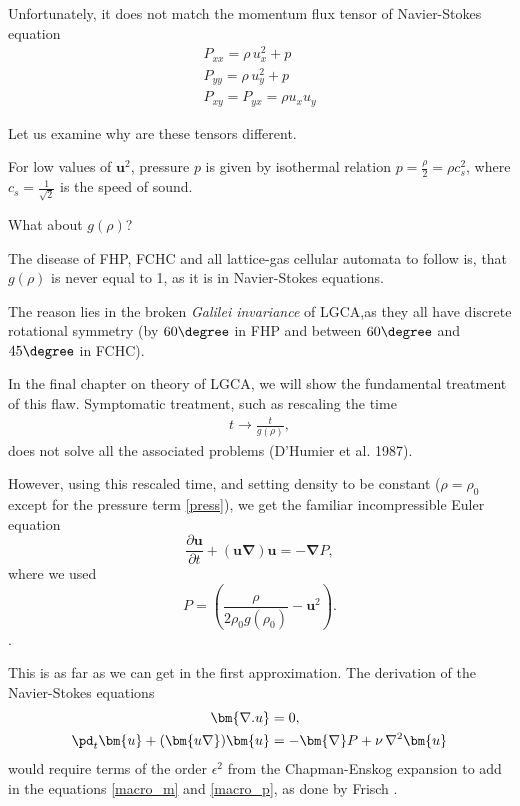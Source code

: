 Unfortunately, it does not match the momentum flux tensor of Navier-Stokes equation
\begin{equation} \label{NST}
\begin{split}
P_{xx} = \rho \, u_x^2 + p\\
P_{yy} = \rho\, u_y^2 + p\\
P_{xy} = P_{yx} = \rho u_x u_y
\end{split}
\end{equation}

Let us examine why are these tensors different.

For low values of $\bm{u}^2$, pressure $p$ is given by isothermal relation \cite{wol} $p = \frac{\rho}{2} = \rho c_s^2$, where $c_s = \frac{1}{\sqrt{2}}$ is the speed of sound.

What about $g(\rho)$?  

The disease of FHP, FCHC and all lattice-gas cellular automata to follow is, that $g(\rho)$ is never equal to 1, as it is in Navier-Stokes equations.

The reason lies in the broken \textit{Galilei invariance} of LGCA,as they all have discrete rotational symmetry (by $60 \degree$ in FHP and between $60 \degree$ and $45 \degree$ in FCHC).

In the final chapter on theory of LGCA, we will show the fundamental treatment of this flaw. Symptomatic treatment, such as rescaling the time
\begin{align} \label{frac_resc}
t \rightarrow \frac{t}{g(\rho)},
\end{align}
does not solve all the associated problems (D'Humier et al. 1987).

However, using this rescaled time, and setting density to be constant ($\rho = \rho_0$ except for the pressure term \ref{press}), we get the familiar incompressible Euler equation
\begin{equation}
\frac{\partial \bm{u}}{\partial t} + (\bm{u} \bm{\nabla}) \bm{u} = -\bm{\nabla} P,
\end{equation}
where we used
\begin{equation} \label{press}
P = (\frac{\rho}{2\rho_0 g(\rho_0)} - \bm{u}^2).
\end{equation}.

This is as far as we can get in the first approximation.
The derivation of the Navier-Stokes equations
\begin{align}
\begin{split}
\bm{\nabla . u} &= 0, \\
\pd_t \bm{u} + (\bm{u \nabla})\bm{u} &= - \bm{\nabla} P + \nu \, \nabla^2 \bm{u}
\end{split}
\end{align}
would require terms of the order $\epsilon^2$  from the Chapman-Enskog expansion to add in the equations \ref{macro_m} and \ref{macro_p}, as done by Frisch \cite{frisch}.

